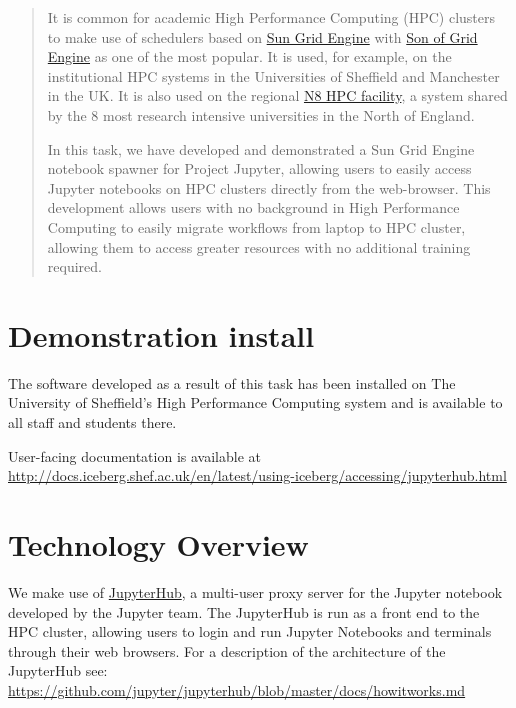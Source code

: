 \documentclass{deliverablereport}
\author{Stuart Mumford, Neil Lawrence \& Mike Croucher}
\begin{document}
\begin{abstract}
It is common for academic High Performance Computing (HPC) clusters to make use of schedulers based on \href{https://en.wikipedia.org/wiki/Oracle_Grid_Engine}{Sun Grid Engine} with \href{https://arc.liv.ac.uk/trac/SGE}{Son of Grid Engine} as one of the most popular. It is used, for example, on the institutional HPC systems in the Universities of Sheffield and Manchester in the UK. It is also used on the regional \href{http://n8hpc.org.uk/}{N8 HPC facility}, a system shared by the 8 most research intensive universities in the North of England. 

In this task, we have developed and demonstrated a Sun Grid Engine notebook spawner for Project Jupyter, allowing users to easily access Jupyter notebooks on HPC clusters directly from the web-browser. This development allows users with no background in High Performance Computing to easily migrate workflows from laptop to HPC cluster, allowing them to access greater resources with no additional training required.

\end{abstract}
\maketitle\vfill
\newpage\tableofcontents\newpage

\section{Demonstration install}

The software developed as a result of this task has been installed on The University of Sheffield's High Performance Computing system and is available to all staff and students there. 

User-facing documentation is available at \url{http://docs.iceberg.shef.ac.uk/en/latest/using-iceberg/accessing/jupyterhub.html}

\section{Technology Overview}

We make use of \href{https://github.com/jupyterhub/jupyterhub}{JupyterHub}, a multi-user proxy server for the Jupyter notebook developed by the Jupyter team.
The JupyterHub is run as a front end to the HPC cluster, allowing users to login and run Jupyter Notebooks and terminals through their web browsers. For a description of the architecture of the JupyterHub see: \url{https://github.com/jupyter/jupyterhub/blob/master/docs/howitworks.md}
\end{document}
